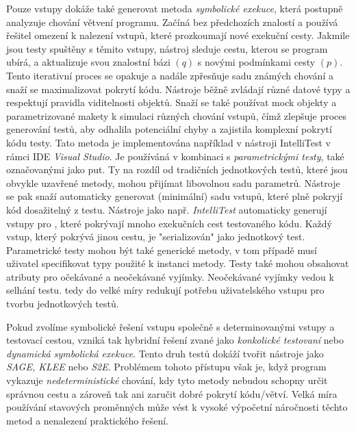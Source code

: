 \documentclass[czech, ma, kiv, he, iso690alph, pdf, viewonly]{fasthesis}
\begin{document}
        Pouze vstupy dokáže také generovat metoda \textit{symbolické exekuce}, která postupně analyzuje chování větvení programu. Začíná bez předchozích znalostí a používá řešitel omezení k nalezení vstupů, které prozkoumají nové exekuční cesty. Jakmile jsou testy spuštěny s těmito vstupy, nástroj sleduje cestu, kterou se program ubírá, a aktualizuje svou znalostní bázi \((q)\) s novými podmínkami cesty \((p)\). Tento iterativní proces se opakuje a nadále zpřesňuje sadu známých chování a snaží se maximalizovat pokrytí kódu. Nástroje běžně zvládají různé datové typy a respektují pravidla viditelnosti objektů. Snaží se také používat mock objekty a parametrizované makety k simulaci různých chování vstupů, čímž zlepšuje proces generování testů, aby odhalila potenciální chyby a zajistila komplexní pokrytí kódu testy. \cite{parizek_symbolic_execution} Tato metoda je implementována například v nástroji IntelliTest v rámci IDE \textit{Visual Studio}. Je používáná v kombinaci s \emph{parametrickými testy}, také označovanými jako \acrshort{put}. Ty na rozdíl od tradičních jednotkových testů, které jsou obvykle uzavřené metody, mohou přijímat libovolnou sadu parametrů. Nástroje se pak snaží automaticky generovat (minimální) sadu vstupů, které plně pokryjí kód dosažitelný z testu. Nástroje jako např. \textit{IntelliTest} automaticky generují vstupy pro , které pokrývají mnoho exekučních cest testovaného kódu. Každý vstup, který pokrývá jinou cestu, je "serializován" jako jednotkový test. Parametrické testy mohou být také generické metody, v tom případě musí uživatel specifikovat typy použité k instanci metody. Testy také mohou obsahovat atributy pro očekávané a neočekávané vyjímky. Neočekávané vyjímky vedou k selhání testu.  tedy do velké míry redukují potřebu uživatelského vstupu pro tvorbu jednotkových testů. \cite{IntelliTestInputGeneration2023} \cite{microsoft2023testgen}

        Pokud zvolíme symbolické řešení vstupu společně s determinovanými vstupy a testovací cestou, vzniká tak hybridní řešení zvané jako \emph{konkolické testovaní} nebo \emph{dynamická symbolická exekuce}. Tento druh testů dokáží tvořit nástroje jako \textit{SAGE, KLEE} nebo \textit{S2E}. Problémem tohoto přístupu však je, když program vykazuje \emph{nedeterministické} chování, kdy tyto metody nebudou schopny určit správnou cestu a zároveň tak ani zaručit dobré pokrytí kódu/větví. Velká míra používání stavových proměnných může vést k vysoké výpočetní náročnosti těchto metod a nenalezení praktického řešení. \cite{engler2006exe} \cite{sen2005cute} \cite{zhou2006safedrive}
\end{document}
